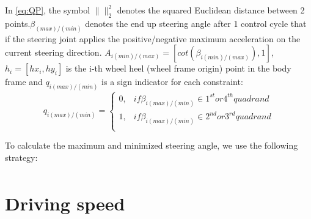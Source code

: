 \begin{figure}[]
	\centering
	\caption{}
	\label{}
\end{figure}



In \cref{eq:QP}, the symbol $\parallel \parallel_2^2$ denotes the squared Euclidean distance between 2 points.$\beta_{(max)/(min)}$ denotes the end up steering angle after 1 control cycle that if the steering joint applies the positive/negative 
maximum acceleration on the current steering direction. $A_{i(min)/(max)}=[cot(\beta_{i(min)/(max)}),1]$,  $h_i=[hx_i,hy_i]$ is the i-th wheel heel
(wheel frame origin) point in the body frame and $q_{i(max)/(min)}$ is a sign indicator for each constraint:
\begin{equation}
	q_{i(max)/(min)}=
	\begin{cases}
		0,&if \beta_{i(max)/(min)}\in 1^{st}or4^{th} quadrand\\
		1,&if \beta_{i(max)/(min)}\in 2^{nd}or3^{rd} quadrand\\
	\end{cases}
\end{equation}

To calculate the maximum and minimized steering angle, we use the following strategy:
\begin{equation}
	\begin{split}
		
	\end{split}
\end{equation}

\section{Driving speed}

